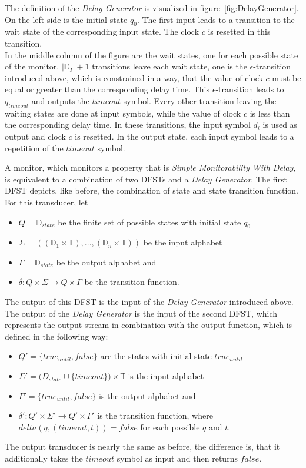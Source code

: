 		The definition of the \textit{Delay Generator} is visualized in figure~\ref{fig:DelayGenerator}. On the left side is the initial state $q_0$. The first input leads to a transition to the wait state of the corresponding input state. The clock $c$ is resetted in this transition.\\
		In the middle column of the figure are the wait states, one for each possible state of the monitor. $|\mathbb{D}_I|+1$ transitions leave each wait state, one is the $\epsilon$-transition introduced above, which is constrained in a way, that the value of clock $c$ must be equal or greater than the corresponding delay time. This $\epsilon$-transition leads to $q_{timeout}$ and outputs the $timeout$ symbol. Every other transition leaving the waiting states are done at input symbols, while the value of clock $c$ is less than the corresponding delay time. In these transitions, the input symbol $d_i$ is used as output and clock $c$ is resetted. In the output state, each input symbol leads to a repetition of the $timeout$ symbol.
	
	
		A monitor, which monitors a property that is \textit{Simple Monitorability With Delay}, is equivalent to a combination of two DFSTs and a \textit{Delay Generator}. The first DFST depicts, like before, the combination of state and state transition function. For this transducer, let
		\begin{itemize}
			\item
			$Q=\mathbb{D}_{state}$ be the finite set of possible states with initial state $q_0$
			\item
			$\Sigma=((\mathbb{D}_1\times \mathbb{T}),...,(\mathbb{D}_n\times \mathbb{T}))$ be the input alphabet
			\item
			$\Gamma = \mathbb D_{state}$ be the output alphabet and
			\item
			$\delta: Q\times \Sigma\rightarrow Q\times\Gamma$ be the transition function.
		\end{itemize}
		The output of this DFST is the input of the \textit{Delay Generator} introduced above. The output of the \textit{Delay Generator} is the input of the second DFST, which represents the output stream in combination with the output function, which is defined in the following way:
		\begin{itemize}
			\item
			$Q' = \{true_{until}, false\}$ are the states with initial state $true_{until}$
			\item
			$\Sigma'=\mathbb (D_{state}\cup\{timeout\})\times \mathbb{T}$ is the input alphabet
			\item
			$\Gamma' = \{true_{until}, false\}$ is the output alphabet and
			\item
			$\delta': Q'\times \Sigma'\rightarrow Q'\times\Gamma'$ is the transition function, where $delta(q, (timeout, t))=false$ for each possible $q$ and $t$.
		\end{itemize}
		The output transducer is nearly the same as before, the difference is, that it additionally takes the $timeout$ symbol as input and then returns $false$.

